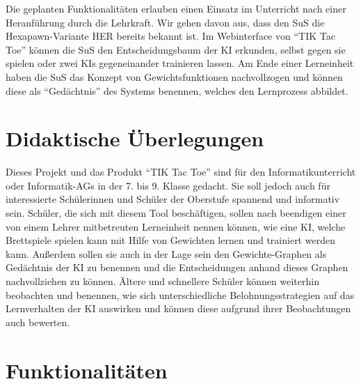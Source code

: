 \documentclass[titlepage]{scrartcl}
\newcommand{\TicTacToe}{TI\reflectbox K Tac Toe}
\begin{document}
Die geplanten Funktionalitäten erlauben einen Einsatz im Unterricht nach einer Heranführung durch die Lehrkraft.
Wir gehen davon aus, dass den SuS die Hexapawn-Variante HER bereits bekannt ist.
Im Webinterface von "`\TicTacToe"' können die SuS den Entscheidungsbaum der KI erkunden, selbst gegen sie spielen oder zwei KIs gegeneinander trainieren lassen.
Am Ende einer Lerneinheit haben die SuS das Konzept von Gewichtsfunktionen nachvollzogen und können diese als "`Gedächtnis"' des Systems benennen, welches den Lernprozess abbildet.%

\section{Didaktische Überlegungen}
Dieses Projekt und das Produkt "`\TicTacToe"' sind für den Informatikunterricht oder Informatik-AGs in der 7. bis 9. Klasse gedacht. Sie soll jedoch auch für interessierte Schülerinnen und Schüler der Oberstufe spannend und informativ sein.
Schüler, die sich mit diesem Tool beschäftigen, sollen nach beendigen einer von einem Lehrer mitbetreuten Lerneinheit nennen können, wie eine KI, welche Brettspiele spielen kann mit Hilfe von Gewichten lernen und trainiert werden kann.
Außerdem sollen sie auch in der Lage sein den Gewichte-Graphen als Gedächtnis der KI zu benennen und die Entscheidungen anhand dieses Graphen nachvollziehen zu können. Ältere und schnellere Schüler können weiterhin beobachten und benennen,
wie sich unterschiedliche Belohnungsstrategien auf das Lernverhalten der KI auswirken und können diese aufgrund ihrer Beobachtungen auch bewerten.

\section{Funktionalitäten}%
\end{document}

